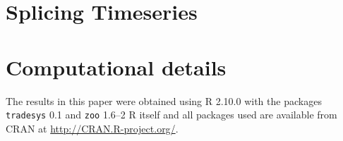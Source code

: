 \documentclass[a4]{article}
\newcommand{\code}[1]{\texttt{#1}}
\begin{document}
\section{Splicing Timeseries}

\section*{Computational details}
The results in this paper were obtained using R
2.10.0 with the packages
\code{tradesys} 0.1 
and \code{zoo}  1.6--2 R itself
and all packages used are available from CRAN at
\url{http://CRAN.R-project.org/}.
\end{document}
